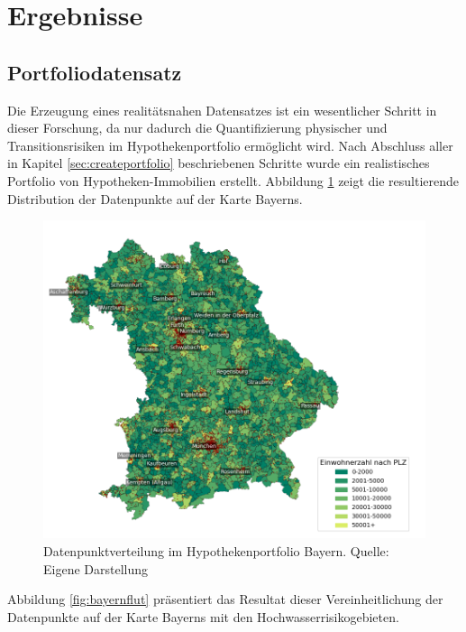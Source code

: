 \section{Ergebnisse}
\subsection{Portfoliodatensatz}
Die Erzeugung eines realitätsnahen Datensatzes ist ein wesentlicher Schritt in dieser Forschung, da nur dadurch die Quantifizierung physischer und Transitionsrisiken im Hypothekenportfolio ermöglicht wird. Nach Abschluss aller in Kapitel \ref{sec:createportfolio} beschriebenen Schritte wurde ein realistisches Portfolio von Hypotheken-Immobilien erstellt.
Abbildung \ref{fig:hypothekenportfolio} zeigt die resultierende Distribution der Datenpunkte auf der Karte Bayerns.

\begin{figure}[htbp]
    \centering
    \includegraphics[width=1.2\textwidth]{figures/bayern_por_pop.png} 
    \caption{Datenpunktverteilung im Hypothekenportfolio Bayern. Quelle: Eigene Darstellung}
    \label{fig:hypothekenportfolio}
\end{figure}
\FloatBarrier

Abbildung \ref{fig:bayernflut} präsentiert das Resultat dieser Vereinheitlichung der Datenpunkte auf der Karte Bayerns mit den Hochwasserrisikogebieten.

